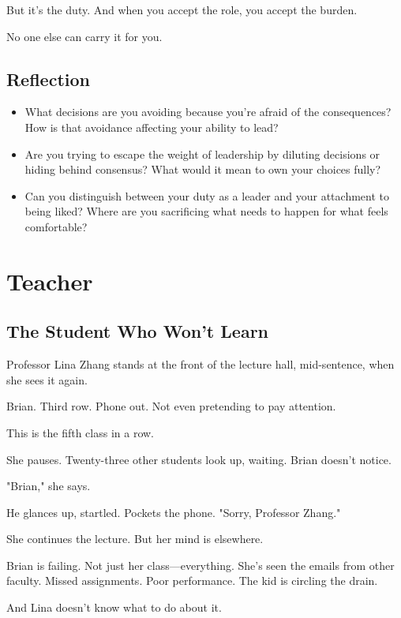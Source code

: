 \documentclass[11pt,twoside]{book}
\begin{document}
But it's the duty. And when you accept the role, you accept the burden.

No one else can carry it for you.

\section*{Reflection}

\begin{itemize}
\item What decisions are you avoiding because you're afraid of the consequences? How is that avoidance affecting your ability to lead?
\item Are you trying to escape the weight of leadership by diluting decisions or hiding behind consensus? What would it mean to own your choices fully?
\item Can you distinguish between your duty as a leader and your attachment to being liked? Where are you sacrificing what needs to happen for what feels comfortable?
\end{itemize}

\chapter{Teacher}

\section*{The Student Who Won't Learn}

Professor Lina Zhang stands at the front of the lecture hall, mid-sentence, when she sees it again.

Brian. Third row. Phone out. Not even pretending to pay attention.

This is the fifth class in a row.

She pauses. Twenty-three other students look up, waiting. Brian doesn't notice.

"Brian," she says.

He glances up, startled. Pockets the phone. "Sorry, Professor Zhang."

She continues the lecture. But her mind is elsewhere.

Brian is failing. Not just her class—everything. She's seen the emails from other faculty. Missed assignments. Poor performance. The kid is circling the drain.

And Lina doesn't know what to do about it.
\end{document}
